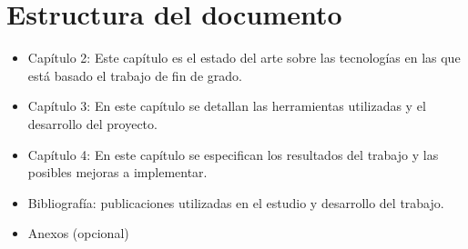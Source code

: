 \section{Estructura del documento}

\begin{itemize}
\item Capítulo 2: Este capítulo es el estado del arte sobre las tecnologías en las que está basado el trabajo de fin de grado. 
\item Capítulo 3: En este capítulo se detallan las herramientas utilizadas y el desarrollo del proyecto.
\item Capítulo 4: En este capítulo se especifican los resultados del trabajo y las posibles mejoras a implementar.
\item Bibliografía: publicaciones utilizadas en el estudio y desarrollo del trabajo.
\item Anexos (opcional)
\end{itemize}

